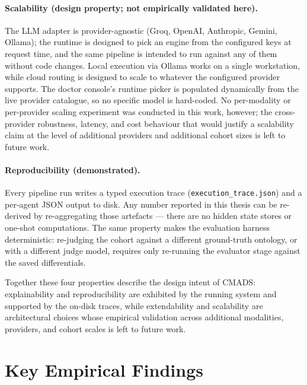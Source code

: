 \paragraph{Scalability (design property; not empirically validated here).}
The LLM adapter is provider-agnostic (Groq, OpenAI, Anthropic,
Gemini, Ollama); the runtime is designed to pick an engine from the
configured keys at request time, and the same pipeline is intended
to run against any of them without code changes. Local execution
via Ollama works on a single workstation, while cloud routing is
designed to scale to whatever the configured provider supports. The
doctor console's runtime picker is populated dynamically from the
live provider catalogue, so no specific model is hard-coded. No
per-modality or per-provider scaling experiment was conducted in
this work, however; the cross-provider robustness, latency, and
cost behaviour that would justify a scalability claim at the level
of additional providers and additional cohort sizes is left to future
work.

\paragraph{Reproducibility (demonstrated).}
Every pipeline run writes a typed execution trace
(\texttt{execution\_trace.json}) and a per-agent JSON output to disk.
Any number reported in this thesis can be re-derived by re-aggregating
those artefacts --- there are no hidden state stores or one-shot
computations. The same property makes the evaluation harness
deterministic: re-judging the cohort against a different ground-truth
ontology, or with a different judge model, requires only re-running
the evaluator stage against the saved differentials.

Together these four properties describe the design intent of CMADS:
explainability and reproducibility are exhibited by the running
system and supported by the on-disk traces, while extendability and
scalability are architectural choices whose empirical validation
across additional modalities, providers, and cohort scales is left
to future work.

\section{Key Empirical Findings}
\label{sec:concl_findings}

